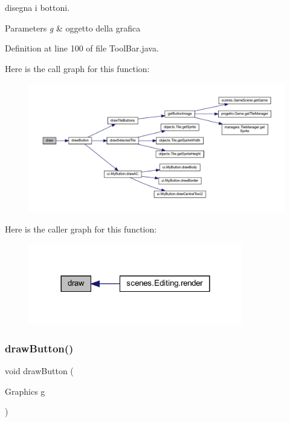 disegna i bottoni. 


\begin{DoxyParams}{Parameters}
{\em g} & oggetto della grafica \\
\hline
\end{DoxyParams}


Definition at line 100 of file Tool\+Bar.\+java.

Here is the call graph for this function\+:
\nopagebreak
\begin{figure}[H]
\begin{center}
\leavevmode
\includegraphics[width=350pt]{classui_1_1_tool_bar_a72fe1ffca978e99fd16994a10e7f8051_cgraph}
\end{center}
\end{figure}
Here is the caller graph for this function\+:\nopagebreak
\begin{figure}[H]
\begin{center}
\leavevmode
\includegraphics[width=264pt]{classui_1_1_tool_bar_a72fe1ffca978e99fd16994a10e7f8051_icgraph}
\end{center}
\end{figure}
\mbox{\label{classui_1_1_tool_bar_a65768678909bc0512c6cb9780709ad38}} 
\subsubsection{\texorpdfstring{draw\+Button()}{drawButton()}}
{\footnotesize\ttfamily void draw\+Button (\begin{DoxyParamCaption}\item[{Graphics}]{g }\end{DoxyParamCaption})}



